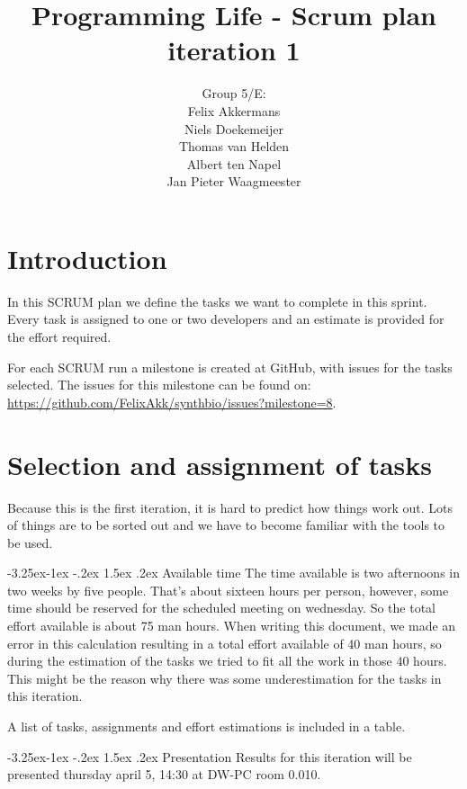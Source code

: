 \documentclass[a4paper]{article}
\title{Programming Life - Scrum plan iteration 1}
\author{Group 5/E:\\
Felix Akkermans \\
Niels Doekemeijer \\
Thomas van Helden \\
Albert ten Napel \\
Jan Pieter Waagmeester}
\makeatletter
\renewcommand\paragraph{\@startsection{paragraph}{4}{\z@}%
  {-3.25ex\@plus -1ex \@minus -.2ex}%
  {1.5ex \@plus .2ex}%
  {\normalfont\normalsize\bfseries}}
\newcommand{\githubmilestone}[1]{\url{https://github.com/FelixAkk/synthbio/issues?milestone=#1}}
\makeatother
\begin{document}
\maketitle

\section{Introduction}
In this SCRUM plan we define the tasks we want to complete in this sprint. Every task is assigned to one or two developers and an estimate is provided for the effort required.

For each SCRUM run a milestone is created at GitHub, with issues for the tasks selected. The issues for this milestone can be found on: \githubmilestone{8}.

\section{Selection and assignment of tasks}
Because this is the first iteration, it is hard to predict how things work out. Lots of things are to be sorted out and we have to become familiar with the tools to be used.

\paragraph{Available time}
The time available is two afternoons in two weeks by five people. That's about sixteen hours per person, however, some time should be reserved for the scheduled meeting on wednesday. So the total effort available is about 75 man hours. When writing this document, we made an error in this calculation resulting in a total effort available of 40 man hours, so during the estimation of the tasks we tried to fit all the work in those 40 hours. This might be the reason why there was some underestimation for the tasks in this iteration.

A list of tasks, assignments and effort estimations is included in a table.


\paragraph{Presentation}
Results for this iteration will be presented thursday april 5, 14:30 at DW-PC room 0.010.
\end{document}
